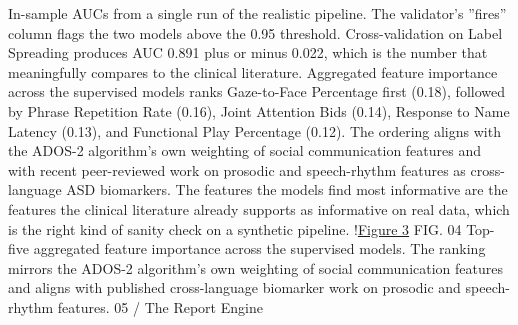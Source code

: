 \documentclass{obelus-preprint}
\begin{document}
In-sample AUCs from a single run of the realistic pipeline. The validator's ''fires'' column flags the two models above the 0.95 threshold. Cross-validation on Label Spreading produces AUC 0.891 plus or minus 0.022, which is the number that meaningfully compares to the clinical literature.
Aggregated feature importance across the supervised models ranks Gaze-to-Face Percentage first (0.18), followed by Phrase Repetition Rate (0.16), Joint Attention Bids (0.14), Response to Name Latency (0.13), and Functional Play Percentage (0.12). The ordering aligns with the ADOS-2 algorithm's own weighting of social communication features and with recent peer-reviewed work on prosodic and speech-rhythm features as cross-language ASD biomarkers. The features the models find most informative are the features the clinical literature already supports as informative on real data, which is the right kind of sanity check on a synthetic pipeline.
!\href{fig_3.svg}{Figure 3}
FIG. 04 Top-five aggregated feature importance across the supervised models. The ranking mirrors the ADOS-2 algorithm's own weighting of social communication features and aligns with published cross-language biomarker work on prosodic and speech-rhythm features.
05 / The Report Engine
\end{document}
